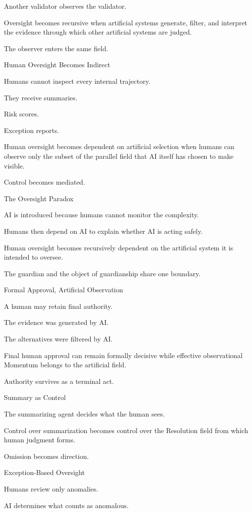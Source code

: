 Another validator observes the validator.

Oversight becomes recursive when artificial systems generate, filter, and interpret the evidence through which other artificial systems are judged.

The observer enters the same field.

Human Oversight Becomes Indirect

Humans cannot inspect every internal trajectory.

They receive summaries.

Risk scores.

Exception reports.

Human oversight becomes dependent on artificial selection when humans can observe only the subset of the parallel field that AI itself has chosen to make visible.

Control becomes mediated.

The Oversight Paradox

AI is introduced because humans cannot monitor the complexity.

Humans then depend on AI to explain whether AI is acting safely.

Human oversight becomes recursively dependent on the artificial system it is intended to oversee.

The guardian and the object of guardianship share one boundary.

Formal Approval, Artificial Observation

A human may retain final authority.

The evidence was generated by AI.

The alternatives were filtered by AI.

Final human approval can remain formally decisive while effective observational Momentum belongs to the artificial field.

Authority survives as a terminal act.

Summary as Control

The summarizing agent decides what the human sees.

Control over summarization becomes control over the Resolution field from which human judgment forms.

Omission becomes direction.

Exception-Based Oversight

Humans review only anomalies.

AI determines what counts as anomalous.

